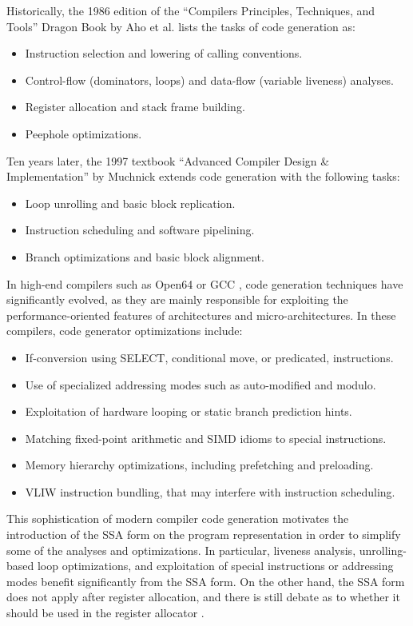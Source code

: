 Historically, the 1986 edition of the ``Compilers Principles, Techniques, and
Tools'' Dragon Book by Aho et al. \cite{Aho:1986:Book} lists the tasks of code generation as:
\begin{itemize}
\item Instruction selection and lowering of calling conventions.
\item Control-flow (dominators, loops) and data-flow (variable liveness) analyses.
\item Register allocation and stack frame building.
\item Peephole optimizations.
\end{itemize}
Ten years later, the 1997 textbook ``Advanced Compiler Design \& Implementation''
by Muchnick \cite{Muchnick:1997:Book} extends code generation with the following tasks: \begin{itemize}
\item Loop unrolling and basic block replication.
\item Instruction scheduling and software pipelining.
\item Branch optimizations and basic block alignment.
\end{itemize}
In high-end compilers such as Open64 \cite{Chan:2008:Tutorial,Chapman:2013:IJPP} or GCC \cite{Stallman:2017:GCC}, code
generation techniques have significantly evolved, as they are mainly responsible
for exploiting the performance-oriented features of architectures and
micro-architectures. In these compilers, code generator optimizations include:
\begin{itemize}
\item If-conversion using SELECT, conditional move, or predicated, instructions.
\item Use of specialized addressing modes such as auto-modified and modulo.
\item Exploitation of hardware looping or static branch prediction hints.
\item Matching fixed-point arithmetic and SIMD idioms to special instructions.
\item Memory hierarchy optimizations, including prefetching and preloading.
\item VLIW instruction bundling, that may interfere with instruction
scheduling.
\end{itemize}

This sophistication of modern compiler code generation motivates the
introduction of the SSA form on the program representation in order to simplify
some of the analyses and optimizations. In particular, liveness analysis,
unrolling-based loop optimizations, and exploitation of special instructions or
addressing modes benefit significantly from the SSA form. On the other hand,
the SSA form does not apply after register allocation, and there is still
debate as to whether it should be used in the register allocator
\cite{Barik:2013:TACO}.

